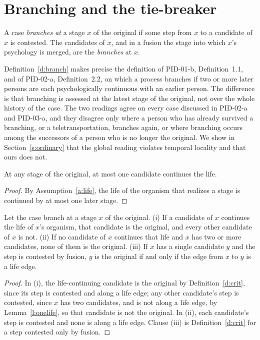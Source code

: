 \documentclass{situationist-preprint}
\begin{document}
\section{Branching and the tie-breaker}\label{s:branching}

\begin{definition}[Branching]\label{d:branch}
A case \emph{branches at} a stage $x$ of the original if some step from $x$ to a candidate of $x$ is contested. The candidates of $x$, and in a fusion the stage into which $x$'s psychology is merged, are the \emph{branches} at $x$.
\end{definition}

Definition~\ref{d:branch} makes precise the definition of PID-01-b, Definition~1.1, and of PID-02-a, Definition~2.2, on which a process branches if two or more later persons are each psychologically continuous with an earlier person. The difference is that branching is assessed at the latest stage of the original, not over the whole history of the case. The two readings agree on every case discussed in PID-02-a and PID-03-a, and they disagree only where a person who has already survived a branching, or a teletransportation, branches again, or where branching occurs among the successors of a person who is no longer the original. We show in Section~\ref{s:ordinary} that the global reading violates temporal locality and that ours does not.

\begin{lemma}\label{l:onelife}
At any stage of the original, at most one candidate continues the life.
\end{lemma}

\begin{proof}
By Assumption~\ref{a:life}, the life of the organism that realizes a stage is continued by at most one later stage.
\end{proof}

\begin{theorem}\label{t:tie}
Let the case branch at a stage $x$ of the original. (i) If a candidate of $x$ continues the life of $x$'s organism, that candidate is the original, and every other candidate of $x$ is not. (ii) If no candidate of $x$ continues that life and $x$ has two or more candidates, none of them is the original. (iii) If $x$ has a single candidate $y$ and the step is contested by fusion, $y$ is the original if and only if the edge from $x$ to $y$ is a life edge.
\end{theorem}

\begin{proof}
In (i), the life-continuing candidate is the original by Definition~\ref{d:crit}, since its step is contested and along a life edge; any other candidate's step is contested, since $x$ has two candidates, and is not along a life edge, by Lemma~\ref{l:onelife}, so that candidate is not the original. In (ii), each candidate's step is contested and none is along a life edge. Clause (iii) is Definition~\ref{d:crit} for a step contested only by fusion.
\end{proof}
\end{document}
